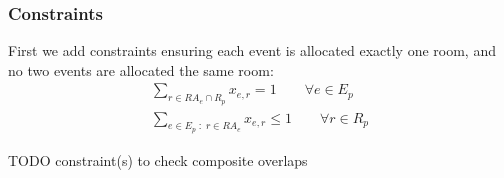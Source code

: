 \documentclass{article}
\theoremstyle{plain}
\numberwithin{theorem}{section}
\numberwithin{example}{section}
\theoremstyle{definition}
\begin{document}
\subsubsection*{Constraints}
First we add constraints ensuring each event is allocated exactly one room, and
no two events are allocated the same room:
\begin{gather*}
    \sum_{r \in RA_e \cap R_p} x_{e,r} = 1 \qquad \forall e \in E_p \\
    \sum_{e \in E_p \; : \; r \in RA_e} x_{e, r} \leq 1 \qquad \forall r \in R_p
\end{gather*}

TODO constraint(s) to check composite overlaps
\end{document}
